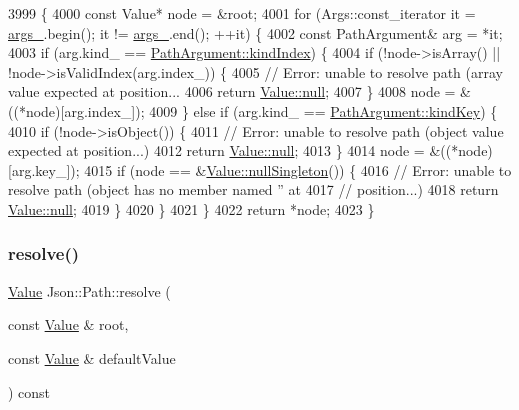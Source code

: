\begin{DoxyCode}
3999                                                   \{
4000   \textcolor{keyword}{const} Value* node = &root;
4001   \textcolor{keywordflow}{for} (Args::const\_iterator it = \hyperlink{class_json_1_1_path_af33d0de7ee9f99d3e361bdf504dc2bc7}{args\_}.begin(); it != \hyperlink{class_json_1_1_path_af33d0de7ee9f99d3e361bdf504dc2bc7}{args\_}.end(); ++it) \{
4002     \textcolor{keyword}{const} PathArgument& arg = *it;
4003     \textcolor{keywordflow}{if} (arg.kind\_ == \hyperlink{class_json_1_1_path_argument_a2420bbad778573c147e578701b84d9b9ae5a976b898111903334cb131f5e03dc4}{PathArgument::kindIndex}) \{
4004       \textcolor{keywordflow}{if} (!node->isArray() || !node->isValidIndex(arg.index\_)) \{
4005         \textcolor{comment}{// Error: unable to resolve path (array value expected at position...}
4006         \textcolor{keywordflow}{return} \hyperlink{class_json_1_1_value_a21ddb05b92c60c7548e928bf371e7d45}{Value::null};
4007       \}
4008       node = &((*node)[arg.index\_]);
4009     \} \textcolor{keywordflow}{else} \textcolor{keywordflow}{if} (arg.kind\_ == \hyperlink{class_json_1_1_path_argument_a2420bbad778573c147e578701b84d9b9a74f5968d06c01701b7a46092c33ba7d1}{PathArgument::kindKey}) \{
4010       \textcolor{keywordflow}{if} (!node->isObject()) \{
4011         \textcolor{comment}{// Error: unable to resolve path (object value expected at position...)}
4012         \textcolor{keywordflow}{return} \hyperlink{class_json_1_1_value_a21ddb05b92c60c7548e928bf371e7d45}{Value::null};
4013       \}
4014       node = &((*node)[arg.key\_]);
4015       \textcolor{keywordflow}{if} (node == &\hyperlink{class_json_1_1_value_af2f124567acc35d021a424e53ebdfcab}{Value::nullSingleton}()) \{
4016         \textcolor{comment}{// Error: unable to resolve path (object has no member named '' at}
4017         \textcolor{comment}{// position...)}
4018         \textcolor{keywordflow}{return} \hyperlink{class_json_1_1_value_a21ddb05b92c60c7548e928bf371e7d45}{Value::null};
4019       \}
4020     \}
4021   \}
4022   \textcolor{keywordflow}{return} *node;
4023 \}
\end{DoxyCode}
\mbox{\label{class_json_1_1_path_ab65ab001ccdbc6f8b5f123da58b92539}} 
\subsubsection{\texorpdfstring{resolve()}{resolve()}\hspace{0.1cm}{\footnotesize\ttfamily [2/2]}}
{\footnotesize\ttfamily \hyperlink{class_json_1_1_value}{Value} Json\+::\+Path\+::resolve (\begin{DoxyParamCaption}\item[{const \hyperlink{class_json_1_1_value}{Value} \&}]{root,  }\item[{const \hyperlink{class_json_1_1_value}{Value} \&}]{default\+Value }\end{DoxyParamCaption}) const}



